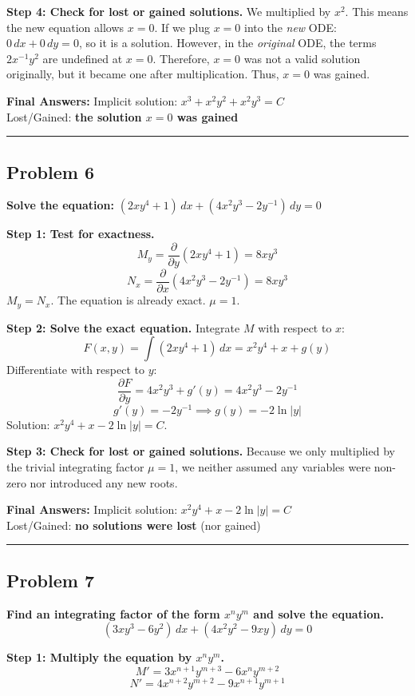 \documentclass[11pt]{article}
\begin{document}
\textbf{Step 4: Check for lost or gained solutions.}
We multiplied by $x^2$. This means the new equation allows $x=0$.
If we plug $x=0$ into the \emph{new} ODE: $0 \, dx + 0 \, dy = 0$, so it is a solution.
However, in the \emph{original} ODE, the terms $2x^{-1}y^2$ are undefined at $x=0$. Therefore, $x=0$ was not a valid solution originally, but it became one after multiplication. Thus, $x=0$ was gained.

\textbf{Final Answers:}
Implicit solution: $x^3 + x^2y^2 + x^2y^3 = C$ \\
Lost/Gained: \textbf{the solution $x=0$ was gained}

\noindent\rule{\textwidth}{0.4pt}

\subsection*{Problem 6}
\textbf{Solve the equation: } $(2xy^4 + 1) \, dx + (4x^2y^3 - 2y^{-1}) \, dy = 0$

\textbf{Step 1: Test for exactness.}
\[ M_y = \frac{\partial}{\partial y}(2xy^4 + 1) = 8xy^3 \]
\[ N_x = \frac{\partial}{\partial x}(4x^2y^3 - 2y^{-1}) = 8xy^3 \]
$M_y = N_x$. The equation is already exact. $\mu = 1$.

\textbf{Step 2: Solve the exact equation.}
Integrate $M$ with respect to $x$:
\[ F(x,y) = \int (2xy^4 + 1) \, dx = x^2y^4 + x + g(y) \]
Differentiate with respect to $y$:
\[ \frac{\partial F}{\partial y} = 4x^2y^3 + g'(y) = 4x^2y^3 - 2y^{-1} \]
\[ g'(y) = -2y^{-1} \implies g(y) = -2\ln|y| \]
Solution: $x^2y^4 + x - 2\ln|y| = C$.

\textbf{Step 3: Check for lost or gained solutions.}
Because we only multiplied by the trivial integrating factor $\mu=1$, we neither assumed any variables were non-zero nor introduced any new roots.

\textbf{Final Answers:}
Implicit solution: $x^2y^4 + x - 2\ln|y| = C$ \\
Lost/Gained: \textbf{no solutions were lost} (nor gained)

\noindent\rule{\textwidth}{0.4pt}

\subsection*{Problem 7}
\textbf{Find an integrating factor of the form $x^n y^m$ and solve the equation.}
\[ (3xy^3 - 6y^2) \, dx + (4x^2y^2 - 9xy) \, dy = 0 \]

\textbf{Step 1: Multiply the equation by $x^n y^m$.}
\[ M' = 3x^{n+1}y^{m+3} - 6x^n y^{m+2} \]
\[ N' = 4x^{n+2}y^{m+2} - 9x^{n+1}y^{m+1} \]
\end{document}
